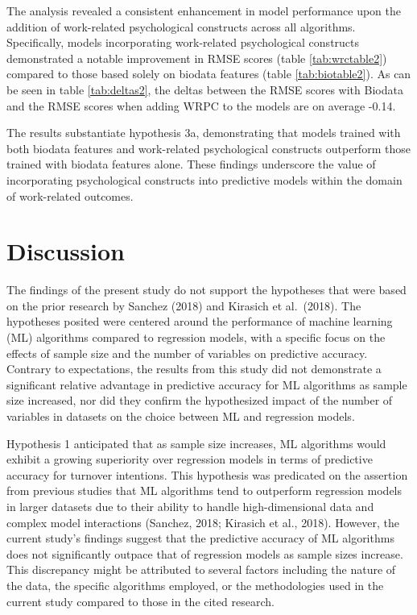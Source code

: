 \documentclass[
  man]{apa7}
\begin{document}
The analysis revealed a consistent enhancement in model performance upon the addition of work-related psychological constructs across all algorithms. Specifically, models incorporating work-related psychological constructs demonstrated a notable improvement in RMSE scores (table \ref{tab:wrctable2}) compared to those based solely on biodata features (table \ref{tab:biotable2}). As can be seen in table \ref{tab:deltas2}, the deltas between the RMSE scores with Biodata and the RMSE scores when adding WRPC to the models are on average -0.14.

The results substantiate hypothesis 3a, demonstrating that models trained with both biodata features and work-related psychological constructs outperform those trained with biodata features alone. These findings underscore the value of incorporating psychological constructs into predictive models within the domain of work-related outcomes.

\hypertarget{discussion}{%
\section{Discussion}\label{discussion}}

The findings of the present study do not support the hypotheses that were based on the prior research by Sanchez (2018) and Kirasich et al.~(2018). The hypotheses posited were centered around the performance of machine learning (ML) algorithms compared to regression models, with a specific focus on the effects of sample size and the number of variables on predictive accuracy. Contrary to expectations, the results from this study did not demonstrate a significant relative advantage in predictive accuracy for ML algorithms as sample size increased, nor did they confirm the hypothesized impact of the number of variables in datasets on the choice between ML and regression models.

Hypothesis 1 anticipated that as sample size increases, ML algorithms would exhibit a growing superiority over regression models in terms of predictive accuracy for turnover intentions. This hypothesis was predicated on the assertion from previous studies that ML algorithms tend to outperform regression models in larger datasets due to their ability to handle high-dimensional data and complex model interactions (Sanchez, 2018; Kirasich et al., 2018). However, the current study's findings suggest that the predictive accuracy of ML algorithms does not significantly outpace that of regression models as sample sizes increase. This discrepancy might be attributed to several factors including the nature of the data, the specific algorithms employed, or the methodologies used in the current study compared to those in the cited research.
\end{document}

